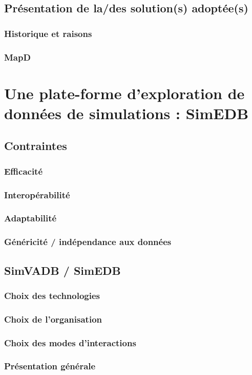 	\subsection{Présentation de la/des solution(s) adoptée(s)}
		\subsubsection{Historique et raisons}
		\subsubsection{MapD}
	
\section{Une plate-forme d'exploration de données de simulations : SimEDB}
	\subsection{Contraintes}
		\subsubsection{Efficacité}
		\subsubsection{Interopérabilité}
		\subsubsection{Adaptabilité}
		\subsubsection{Généricité / indépendance aux données}
		
	\subsection{SimVADB / SimEDB}
		\subsubsection{Choix des technologies}
		\subsubsection{Choix de l'organisation}
		\subsubsection{Choix des modes d'interactions}
		\subsubsection{Présentation générale}

